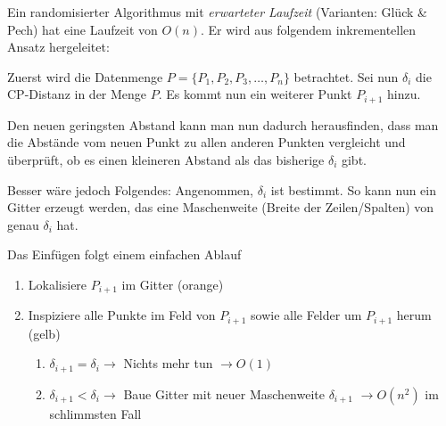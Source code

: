 \documentclass{scrartcl}%
\begin{document}
    Ein randomisierter Algorithmus mit \textit{erwarteter Laufzeit}
    (Varianten: Glück \& Pech) hat eine Laufzeit von $O(n)$.
    Er wird aus folgendem inkrementellen Ansatz hergeleitet:

    Zuerst wird die Datenmenge $P = \{ P_1, P_2, P_3, \dots, P_n \}$ betrachtet.
    Sei nun $\delta_i$ die CP-Distanz in der Menge $P$.
    Es kommt nun ein weiterer Punkt $P_{i+1}$ hinzu.

    Den neuen geringsten Abstand kann man nun dadurch herausfinden,
    dass man die Abstände vom neuen Punkt zu allen anderen Punkten vergleicht und überprüft,
    ob es einen kleineren Abstand als das bisherige $\delta_i$ gibt.

    Besser wäre jedoch Folgendes: Angenommen, $\delta_i$ ist bestimmt.
    So kann nun ein Gitter erzeugt werden, das eine Maschenweite
    (Breite der Zeilen/Spalten) von genau $\delta_i$ hat.

    \begin{figure}[H]
        \centering
        \begin{table}[H]
            \centering
        \end{table}
    \end{figure}

    Das Einfügen folgt einem einfachen Ablauf

    \begin{enumerate}
        \item Lokalisiere $P_{i+1}$ im Gitter (orange)
        \item Inspiziere alle Punkte im Feld von $P_{i+1}$ sowie alle Felder um $P_{i+1}$ herum (gelb)
        \begin{enumerate}
            \item $\delta_{i+1} = \delta_i \rightarrow$ Nichts mehr tun $\rightarrow O(1)$
            \item $\delta_{i+1} < \delta_i \rightarrow$ Baue Gitter mit neuer Maschenweite
            $\delta_{i+1}$ $\rightarrow O(n^2)$ im schlimmsten Fall
        \end{enumerate}
    \end{enumerate}
\end{document}
